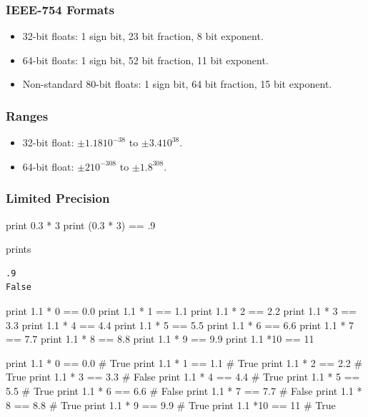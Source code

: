 \begin{frame}[fragile]
\frametitle{IEEE-754 Formats}

\begin{itemize}
\item 32-bit floats: 1 sign bit, 23 bit fraction, 8 bit exponent.
\item 64-bit floats: 1 sign bit, 52 bit fraction, 11 bit exponent.
\item \alert{Non-standard} 80-bit floats: 1 sign bit, 64 bit fraction, 15 bit exponent.
\end{itemize}
\end{frame}

\begin{frame}[fragile]
\frametitle{Ranges}

\begin{itemize}
\item 32-bit float: $\pm 1.18 10^{-38}$ to $\pm 3.4 10^{38}$.
\item 64-bit float: $\pm 2 10^{-308}$ to $\pm 1.8 ^{308}$.
\end{itemize}
\end{frame}

\begin{frame}[fragile]
\frametitle{Limited Precision}

\begin{python}

print 0.3 * 3
print (0.3 * 3) == .9
\end{python}
prints
\begin{verbatim}
.9
False
\end{verbatim}
\end{frame}

\begin{frame}[fragile]
\begin{python}
print 1.1 * 0 == 0.0  
print 1.1 * 1 == 1.1  
print 1.1 * 2 == 2.2 
print 1.1 * 3 == 3.3 
print 1.1 * 4 == 4.4 
print 1.1 * 5 == 5.5 
print 1.1 * 6 == 6.6 
print 1.1 * 7 == 7.7 
print 1.1 * 8 == 8.8 
print 1.1 * 9 == 9.9 
print 1.1 *10 == 11 
\end{python}
\end{frame}

\begin{frame}[fragile]
\begin{python}
print 1.1 * 0 == 0.0    #  True
print 1.1 * 1 == 1.1    #  True
print 1.1 * 2 == 2.2    #  True
print 1.1 * 3 == 3.3    #  False
print 1.1 * 4 == 4.4    #  True
print 1.1 * 5 == 5.5    #  True
print 1.1 * 6 == 6.6    #  False
print 1.1 * 7 == 7.7    #  False
print 1.1 * 8 == 8.8    #  True
print 1.1 * 9 == 9.9    #  True
print 1.1 *10 == 11     #  True
\end{python}
\end{frame}

